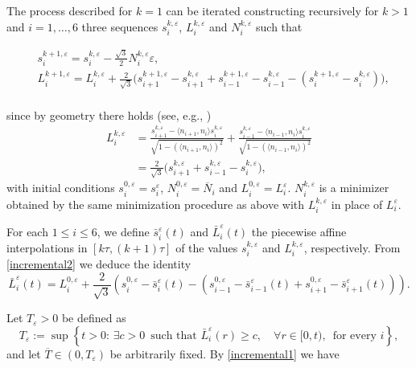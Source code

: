 \documentclass{interact}
\numberwithin{equation}{section}
\theoremstyle{definition}
\renewcommand{\epsilon}{\varepsilon}
\begin{document}
The process described for $k=1$ can be iterated constructing recursively for $k>1$ and $i=1,\dots,6$ three sequences $s_i^{k,\epsilon}$, $L_i^{k,\epsilon}$ and $N_{i}^{k,\epsilon}$ such that

{\begin{eqnarray}
&s_i^{k+1,\epsilon}=s_i^{k,\epsilon}-\frac{\sqrt3}{2}N_{i}^{k,\epsilon}\epsilon,\label{incremental1}\\
&L_i^{k+1,\epsilon}=L_i^{k,\epsilon}+\frac{2}{\sqrt{3}}\bigl(s_{i+1}^{k+1,\epsilon}-s_{i+1}^{k,\epsilon}+s_{i-1}^{k+1,\epsilon}-s_{i-1}^{k,\epsilon}-(s_{i}^{k+1,\epsilon}-s_{i}^{k,\epsilon})\bigr), \label{incremental2}%
\end{eqnarray}
\\
since by geometry there holds (see, e.g., \cite[p. 423]{Ta})
\begin{equation}
\begin{split}
L_i^{k,\epsilon}&=\frac{s_{i+1}^{k,\epsilon}-\langle n_{i+1}, n_i\rangle s_i^{k,\epsilon}}{\sqrt{1-(\langle n_{i+1}, n_i\rangle)^2}}+\frac{s_{i-1}^{k,\epsilon}-\langle n_{i-1}, n_i\rangle s_i^{k,\epsilon}}{\sqrt{1-(\langle n_{i-1}, n_i\rangle)^2}}\\
&=\frac{2}{\sqrt{3}}\bigl(s_{i+1}^{k,\epsilon}+s_{i-1}^{k,\epsilon}-s_{i}^{k,\epsilon}\bigr),
\end{split}
\label{geomconstr}
\end{equation}}
with initial conditions $s_i^{0,\epsilon}=s_i^\epsilon$, $N_{i}^{0,\epsilon}=\overline{N}_{i}$ and $L_i^{0,\epsilon}=L_i^\epsilon$. $N_{i}^{k,\epsilon}$ is a minimizer obtained by the same minimization procedure as above with $L_i^{k,\epsilon}$ in place of $L_i^{\epsilon}$. 

For each $1\leq i\leq6$, we define $\bar{s}_i^\epsilon(t)$ and $\bar{L}_i^\epsilon(t)$ the piecewise affine interpolations in $[k\tau, (k+1)\tau]$ of the values $s_i^{k,\epsilon}$ and $L_i^{k,\epsilon}$, respectively. From \eqref{incremental2} we deduce the identity
\begin{equation}
\bar{L}_i^\epsilon(t)=L_i^{0,\epsilon}+\frac{2}{\sqrt{3}}(s_i^{0,\epsilon}-\bar{s}_i^\epsilon(t)-(s_{i-1}^{0,\epsilon}-\bar{s}_{i-1}^\epsilon(t)+s_{i+1}^{0,\epsilon}-\bar{s}_{i+1}^\epsilon(t))).
\label{incremental3}
\end{equation} 

Let $T_\epsilon>0$ be defined as
\begin{equation}
T_\epsilon:=\sup\left\{t>0:\, \exists c>0\, \mbox{ such that } \bar{L}_i^\epsilon(r)\geq c,\quad\forall r\in[0,t),\, \mbox{ for every $i$}\right\},
\end{equation}
and let $\overline{T}\in(0,T_\epsilon)$ be arbitrarily fixed. By \eqref{incremental1} we have 
\end{document}
